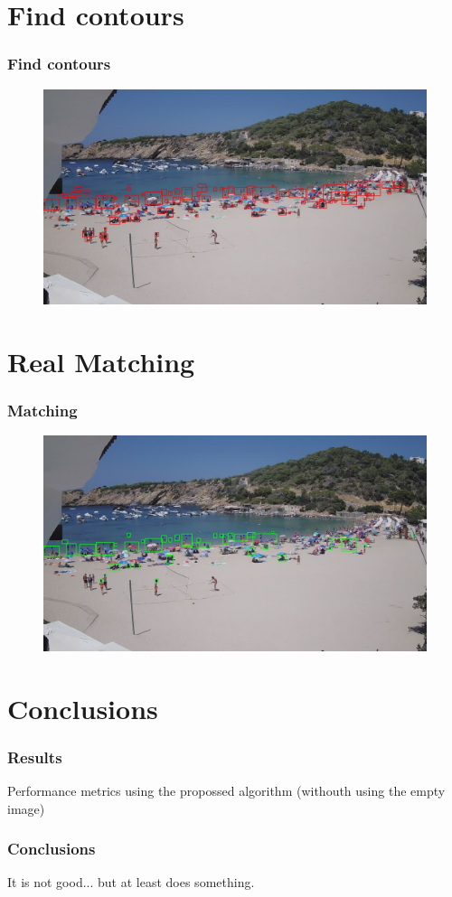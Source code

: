 \documentclass{beamer}
\begin{document}
\section{Find contours}
\begin{frame}
    \frametitle{Find contours}
    \begin{figure}
        \centering
        \includegraphics[width=\textwidth]{../gen/det/1660305600.jpg}
    \end{figure}
\end{frame}

\section{Real Matching}
\begin{frame}
    \frametitle{Matching}
    \begin{figure}
        \centering
        \includegraphics[width=\textwidth]{../gen/match/1660305600.jpg}
    \end{figure}
\end{frame}

\section{Conclusions}
\begin{frame}
    \frametitle{Results}

    \begin{table}
        \centering
        \caption[Performance metrics Basic]{Performance metrics using the propossed algorithm (withouth using the empty image)}\label{table:metrics}
    \end{table}

\end{frame}



\begin{frame}
    \frametitle{Conclusions}
    It is not good... but at least does something.
\end{frame}
\end{document}
